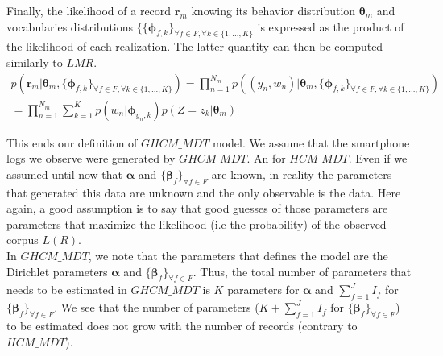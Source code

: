 Finally, the likelihood of a record $\mathbf{r}_{m}$ knowing its behavior distribution $\boldsymbol{\theta}_{m}$ and vocabularies distributions $\{\{\boldsymbol{\phi }_{f,k}\}_{\forall f \in F, \forall k\in\{1,...,K\}}$ is expressed as the product of the likelihood of each realization. The latter quantity can then be computed similarly to $LMR$.
\begin{equation}
\begin{split} 
p(\mathbf{r}_{m}|\boldsymbol{\theta }_{m}, \{\boldsymbol{\phi}_{f,k}\}_{\forall f \in F, \forall k\in\{1,...,K\}})=\prod_{n=1}^{N_{m}}p((y_{n},w_{n})|\boldsymbol{\theta }_{m}, \{\boldsymbol{\phi}_{f,k}\}_{\forall f \in F, \forall k\in\{1,...,K\}})
\\=\prod_{n=1}^{N_{m}}\sum_{k=1}^{K}p(w_{n}|\boldsymbol{\phi}_{y_{n},k})p(Z=z_{k}|\boldsymbol{\theta }_{m})
\end{split} 
\end{equation}
 
This ends our definition of $GHCM\_MDT$ model. We assume that the smartphone logs we observe were generated by $GHCM\_MDT$. An for $HCM\_MDT$. Even if we assumed until now that $\boldsymbol{\alpha}$ and $\{\boldsymbol{\beta }_{f}\}_{\forall f\in F}$ are known, in reality the parameters that generated this data are unknown and the only observable is the data. Here again, a good assumption is to say that good guesses of those parameters are parameters that maximize the likelihood (i.e the probability) of the observed corpus $L(R)$.
\\In $GHCM\_MDT$, we note that the parameters that defines the model are the Dirichlet parameters $\boldsymbol{\alpha}$ and $\{\boldsymbol{\beta }_{f}\}_{\forall f\in F}$. Thus, the total number of parameters that needs to be estimated in $GHCM\_MDT$ is $K$ parameters for $\boldsymbol{\alpha}$ and $\sum_{f=1}^{J}I_{f}$ for $\{\boldsymbol{\beta }_{f}\}_{\forall f\in F}$. We see that the number of parameters ($K+\sum_{f=1}^{J}I_{f}$ for $\{\boldsymbol{\beta }_{f}\}_{\forall f\in F}$) to be estimated does not grow with the number of records (contrary to $HCM\_MDT$). \par

